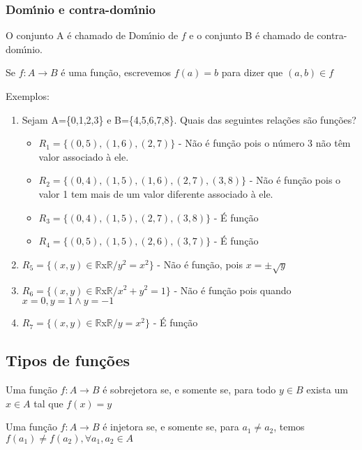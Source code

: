 \subsubsection{Dom{\'\i}nio e contra-dom{\'\i}nio}
O conjunto A {\'e} chamado de Dom{\'\i}nio de $f$ e o conjunto B {\'e} chamado de contra-dom{\'\i}nio.

Se $f:A\rightarrow B$ {\'e} uma fun{\c c}{\~a}o, escrevemos $f(a)=b$ para dizer que $(a,b)\in f$

Exemplos:
\begin{enumerate}
\item Sejam A=\{0,1,2,3\} e B=\{4,5,6,7,8\}. Quais das seguintes rela{\c c}{\~o}es s{\~a}o fun{\c c}{\~o}es?
\begin{itemize}
\item $R_{1}=\{(0,5),(1,6),(2,7)\}$ - N{\~a}o {\'e} fun{\c c}{\~a}o pois o n{\'u}mero 3 n{\~a}o t{\^e}m valor associado {\`a} ele.
\item $R_{2}=\{(0,4),(1,5),(1,6),(2,7),(3,8)\}$ - N{\~a}o {\'e} fun{\c c}{\~a}o pois o valor 1 tem mais de um valor diferente associado {\`a} ele.
\item $R_{3}=\{(0,4),(1,5),(2,7),(3,8)\}$ - {\'E} fun{\c c}{\~a}o
\item $R_{4}=\{(0,5),(1,5),(2,6),(3,7)\}$ - {\'E} fun{\c c}{\~a}o

\end{itemize}
\item $R_{5}=\{(x,y)\in\mathbb{R}$x$\mathbb{R}/y^{2}=x^{2}\}$ - N{\~a}o {\'e} fun{\c c}{\~a}o, pois $x=\pm \sqrt{y}$
\item $R_{6}=\{(x,y)\in\mathbb{R}$x$\mathbb{R}/x^{2}+y^{2}=1\}$ - N{\~a}o {\'e} fun{\c c}{\~a}o pois quando\\ $x=0,y=1\wedge y=-1$
\item  $R_{7}=\{(x,y)\in\mathbb{R}$x$\mathbb{R}/y=x^{2}\}$ - {\'E} fun{\c c}{\~a}o
\end{enumerate}

\subsection{Tipos de fun{\c c}{\~o}es}

\begin{definicao}  Uma fun{\c c}{\~a}o $f:A\rightarrow B$ {\'e} sobrejetora se, e somente se, para todo $y\in B$ exista um $x\in A$ tal que $f(x)=y$\end{definicao}

\begin{definicao} Uma fun{\c c}{\~a}o $f:A\rightarrow B$ {\'e} injetora se, e somente se, para $a_{1}\neq a_{2}$, temos $f(a_{1})\neq f(a_{2}), \forall a_{1},a_{2}\in A$\end{definicao}

